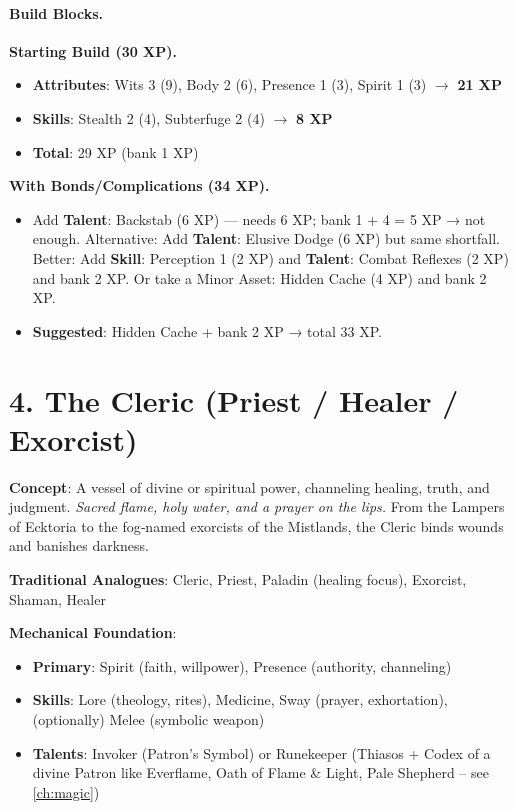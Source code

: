 \paragraph{Build Blocks.}
\textbf{Starting Build (30 XP).}
\begin{itemize}
\item \textbf{Attributes}: Wits 3 (9), Body 2 (6), Presence 1 (3), Spirit 1 (3) $\rightarrow$ \textbf{21 XP}
\item \textbf{Skills}: Stealth 2 (4), Subterfuge 2 (4) $\rightarrow$ \textbf{8 XP}
\item \textbf{Total}: 29 XP (bank 1 XP)
\end{itemize}
\textbf{With Bonds/Complications (34 XP).}
\begin{itemize}
\item Add \textbf{Talent}: Backstab (6 XP) — needs 6 XP; bank 1 + 4 = 5 XP → not enough. Alternative: Add \textbf{Talent}: Elusive Dodge (6 XP) but same shortfall. Better: Add \textbf{Skill}: Perception 1 (2 XP) and \textbf{Talent}: Combat Reflexes (2 XP) and bank 2 XP. Or take a Minor Asset: Hidden Cache (4 XP) and bank 2 XP.
\item \textbf{Suggested}: Hidden Cache + bank 2 XP → total 33 XP.
\end{itemize}

\section{4. The Cleric (Priest / Healer / Exorcist)}
\label{sec:concept-cleric}

\textbf{Concept}: A vessel of divine or spiritual power, channeling healing, truth, and judgment. \emph{Sacred flame, holy water, and a prayer on the lips.} From the Lampers of Ecktoria to the fog‑named exorcists of the Mistlands, the Cleric binds wounds and banishes darkness.

\textbf{Traditional Analogues}: Cleric, Priest, Paladin (healing focus), Exorcist, Shaman, Healer

\textbf{Mechanical Foundation}:
\begin{itemize}
\item \textbf{Primary}: Spirit (faith, willpower), Presence (authority, channeling)
\item \textbf{Skills}: Lore (theology, rites), Medicine, Sway (prayer, exhortation), (optionally) Melee (symbolic weapon)
\item \textbf{Talents}: Invoker (Patron’s Symbol) or Runekeeper (Thiasos + Codex of a divine Patron like Everflame, Oath of Flame \& Light, Pale Shepherd – see \ref{ch:magic})
\end{itemize}

